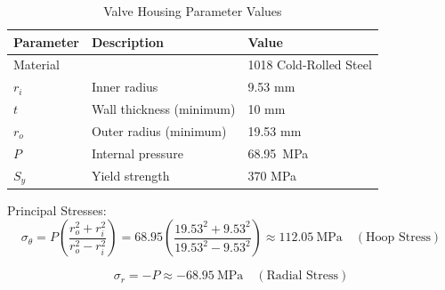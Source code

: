 \documentclass[12pt, letterpaper]{report}%
\newcommand{\specPressure}{68.95}%
\begin{document}
            \begin{table}[H]
                            \centering
                            \caption{Valve Housing Parameter Values}
                            \label{tab:housing_parameters}
                            \begin{tabularx}{\textwidth}{l X l}
                                \toprule
                                \textbf{Parameter} & \textbf{Description} & \textbf{Value} \\
                                \midrule
                                Material &
                                &
                                1018 Cold-Rolled Steel
                                \\\addlinespace
                                $r_i$ &
                                Inner radius &
                                9.53 mm
                                \\\addlinespace
                                $t$ &
                                Wall thickness (minimum) &
                                10 mm
                                \\\addlinespace
                                $r_o$ &
                                Outer radius (minimum) &
                                19.53 mm
                                \\\addlinespace
                                $P$ &
                                Internal pressure &
                                \specPressure\ MPa
                                \\\addlinespace
                                $S_y$ &
                                Yield strength &
                                370 MPa \cite{matweb}
                                \\\bottomrule
                            \end{tabularx}
                        \end{table}

            Principal Stresses:
            \begin{equation}
            \sigma_{\theta} = P \left( \frac{r_o^2 + r_i^2}{r_o^2 - r_i^2} \right) = 68.95 \left( \frac{19.53^2 + 9.53^2}{19.53^2 - 9.53^2} \right) \approx 112.05 \ \text{MPa} \quad (\text{Hoop Stress})
            \label{hoop}    
            \end{equation}

            \begin{equation}
            \sigma_{r} = -P \approx -68.95 \ \text{MPa} \quad (\text{Radial Stress})
            \label{radial}  
           \end{equation}
\end{document}
